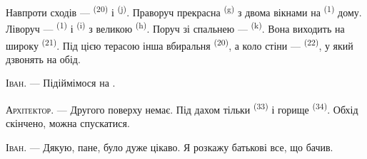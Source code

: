 Навпроти сходів ---  \textsuperscript{(20)} і  \textsuperscript{(j)}. Праворуч прекрасна 
\textsuperscript{(g)} з двома вікнами на  \textsuperscript{(1)}
дому. Ліворуч ---  \textsuperscript{(1)} і  \textsuperscript{(i)} з великою 
\textsuperscript{(h)}. Поруч зі спальнею --- 
\textsuperscript{(k)}. Вона виходить на широку 
\textsuperscript{(21)}. Під цією терасою інша вбиральня \textsuperscript{(20)}, а
коло стіни ---  \textsuperscript{(22)}, у який дзвонять на обід.

\textsc{Іван}. --- Підіймімося на .

\textsc{Архітектор}. --- Другого поверху немає. Під дахом тільки
 \textsuperscript{(33)} і горище \textsuperscript{(34)}. Обхід
скінчено, можна спускатися.

\textsc{Іван}. --- Дякую, пане, було дуже цікаво. Я розкажу батькові все, що
бачив.
\VUsaut{4.0mm}
\VUfilet{22mm}
